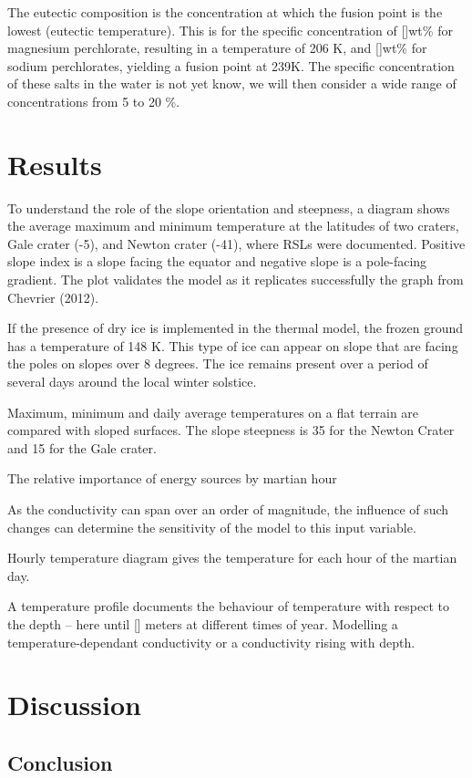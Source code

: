 \documentclass{report}
\begin{document}
    The eutectic composition is the concentration at which the fusion point is the lowest (eutectic temperature). This is for the specific concentration of []wt\% for magnesium perchlorate, resulting in a temperature of 206 K, and []wt\% for sodium perchlorates, yielding a fusion point at 239K. 
    The specific concentration of these salts in the water is not yet know, we will then consider a wide range of concentrations from 5 to 20 \%.   
    
\chapter{Results}
To understand the role of the slope orientation and steepness, a diagram shows the average maximum and minimum temperature at the latitudes of two craters, Gale crater (-5), and Newton crater (-41), where RSLs were documented.
Positive slope index is a slope facing the equator and negative slope is a pole-facing gradient.
The plot validates the model as it replicates successfully the graph from Chevrier (2012). 

If the presence of dry ice is implemented in the thermal model, the frozen ground has a temperature of 148 K. This type of ice can appear on slope that are facing the poles on slopes over 8 degrees. The ice remains present over a period of several days around the local winter solstice.

Maximum, minimum and daily average temperatures on a flat terrain  are compared with sloped surfaces. The slope steepness is 35 for the Newton Crater and 15 for the Gale crater. 

The relative importance of energy sources by martian hour


As the conductivity can span over an order of magnitude, the influence of such changes can determine the sensitivity of the model to this input variable.

Hourly temperature diagram gives the temperature for each hour of the martian day. 

A temperature profile documents the behaviour of temperature with respect to the depth -- here until [] meters at different times of year. 
Modelling a temperature-dependant conductivity or a conductivity rising with depth. 

\chapter{Discussion}

\section*{Conclusion}

\printbibliography 
\end{document}
